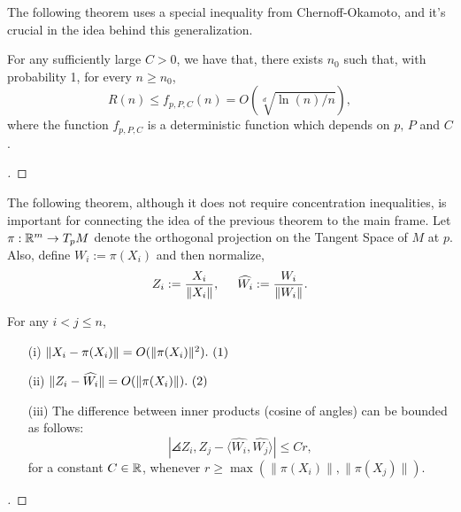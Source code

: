 The following theorem uses a special inequality from Chernoff-Okamoto, and it's crucial in the idea behind this generalization.

\begin{theorem}\label{ade:T2}
  For any sufficiently large $C > 0$, we have that, there exists $n_0$ such that, with probability 1, for every $n \geq n_0$,
  \begin{equation}\label{ade:3}
    R(n) \leq f_{p,P,C}(n) = O(\sqrt[d]{\ln(n)/n}),
  \end{equation}
  where the function $f_{p,P,C}$ is a deterministic function which depends on $p,\, P$ and $C$.
\end{theorem}

\begin{proof}[]

\end{proof}

\vspace*{0.5 em}

The following theorem, although it does not require concentration inequalities, is important for connecting the idea of the previous theorem to the main frame. Let $\pi : \mathbb{R}^m \to T_p M$ denote the orthogonal projection on the Tangent Space of $M$ at $p$. Also, define $W_i := \pi(X_i)$ and then normalize,
\begin{equation}\label{ade:4}
  Z_i := \frac{X_i}{\|X_i\|},\hspace*{5mm} \widehat{W_i} := \frac{W_i}{\|W_i\|}.
\end{equation}

\begin{theorem}\label{ade:T3}
  For any $i<j \leq n$,
  \begin{enumerate}
    \item[(i)]    \( \|X_i-\pi(X_i)\|  =   O(\|\pi (X_i)\|^2). \hfill\inlinetag  \)
    \item[(ii)]   \( \|Z_i-\widehat{W_i}\|  =   O(\|\pi (X_i) \|). \hfill\inlinetag \)
    \item[(iii)]  The difference between inner products (cosine of angles) can be bounded as follows:
    \begin{equation}\label{ade:7}
      |\angles{Z_i,Z_j} - \langle\widehat{W_i}, \widehat{W_j}\rangle| \leq C r,
    \end{equation}
    for a constant $C\in\mathbb{R}$, whenever $r \geq \max (\|\pi(X_i)\|,\|\pi(X_j)\|)$.
  \end{enumerate}
\end{theorem}
\begin{proof}[]

\end{proof}

